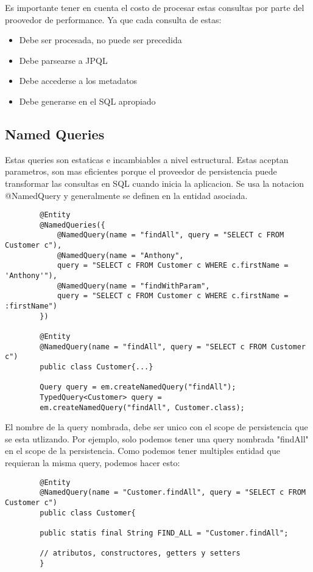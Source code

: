 \documentclass{article}
\begin{document}
Es importante tener en cuenta el costo de procesar estas consultas por parte del proovedor de performance. Ya que cada consulta de estas:
\begin{itemize}
	\item Debe ser procesada, no puede ser precedida
	\item Debe parsearse a JPQL
	\item Debe accederse a los metadatos
	\item Debe generarse en el SQL apropiado
\end{itemize}

\subsection*{Named Queries}
Estas queries son estaticas e incambiables a nivel estructural. Estas aceptan parametros, son mas eficientes porque el proveedor de persistencia puede transformar las consultas
en SQL cuando inicia la aplicacion. Se usa la notacion @NamedQuery y generalmente se definen en la entidad asociada.

\begin{lstlisting}
        @Entity
        @NamedQueries({
            @NamedQuery(name = "findAll", query = "SELECT c FROM Customer c"),
            @NamedQuery(name = "Anthony", 
            query = "SELECT c FROM Customer c WHERE c.firstName = 'Anthony'"),
            @NamedQuery(name = "findWithParam",
            query = "SELECT c FROM Customer c WHERE c.firstName = :firstName")
        })

        @Entity
        @NamedQuery(name = "findAll", query = "SELECT c FROM Customer c")
        public class Customer{...}

        Query query = em.createNamedQuery("findAll");
        TypedQuery<Customer> query = 
        em.createNamedQuery("findAll", Customer.class);
    \end{lstlisting}

El nombre de la query nombrada, debe ser unico con el scope de persistencia que se esta utlizando. Por ejemplo, solo podemos tener una query nombrada "findAll" en el scope de la persistencia.
Como podemos tener multiples entidad que requieran la misma query, podemos hacer esto:

\begin{lstlisting}
        @Entity
        @NamedQuery(name = "Customer.findAll", query = "SELECT c FROM Customer c")
        public class Customer{

        public statis final String FIND_ALL = "Customer.findAll";

        // atributos, constructores, getters y setters
        }
    \end{lstlisting}
\end{document}
